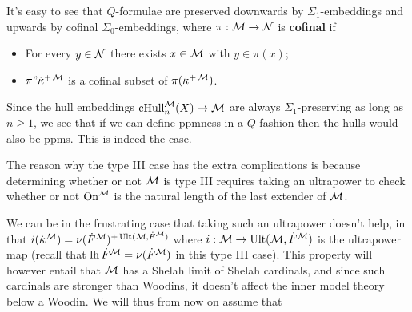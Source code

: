 It's easy to see that $Q$-formulae are preserved downwards by $\Sigma_1$-embeddings and upwards by cofinal $\Sigma_0$-embeddings, where $\pi:\operatorname{\mathcal{M}}\to\operatorname{\mathcal{N}}$ is \textbf{cofinal} if
\begin{itemize}
\item For every $y\in\operatorname{\mathcal{N}}$ there exists $x\in\operatorname{\mathcal{M}}$ with $y\in\pi(x)$;
\item $\pi"\dot\kappa^{+\operatorname{\mathcal{M}}}$ is a cofinal subset of $\pi(\dot\kappa^{+\operatorname{\mathcal{M}}})$.\\
\end{itemize}

Since the hull embeddings $\operatorname{cHull}_n^{\operatorname{\mathcal{M}}}(X)\to\operatorname{\mathcal{M}}$ are always $\Sigma_1$-preserving as long as $n\geq 1$, we see that if we can define ppmness in a $Q$-fashion then the hulls would also be ppms. This is indeed the case.


The reason why the type III case has the extra complications is because determining whether or not $\operatorname{\mathcal{M}}$ is type III requires taking an ultrapower to check whether or not $\operatorname{On}^{\operatorname{\mathcal{M}}}$ is the natural length of the last extender of $\operatorname{\mathcal{M}}$.

\qquad We can be in the frustrating case that taking such an ultrapower doesn't help, in that $i(\dot\kappa^{\operatorname{\mathcal{M}}})=\nu(\dot F^{\operatorname{\mathcal{M}}})^{+\operatorname{Ult}(\operatorname{\mathcal{M}},\dot F^{\operatorname{\mathcal{M}}})}$ where $i:\operatorname{\mathcal{M}}\to\operatorname{Ult}(\operatorname{\mathcal{M}},\dot F^{\operatorname{\mathcal{M}}})$ is the ultrapower map (recall that $\operatorname{lh}\dot F^{\operatorname{\mathcal{M}}}=\nu(\dot F^{\operatorname{\mathcal{M}}})$ in this type III case). This property will however entail that $\operatorname{\mathcal{M}}$ has a Shelah limit of Shelah cardinals, and since such cardinals are stronger than Woodins, it doesn't affect the inner model theory below a Woodin. We will thus from now on assume that
\begin{center}
\end{center}

